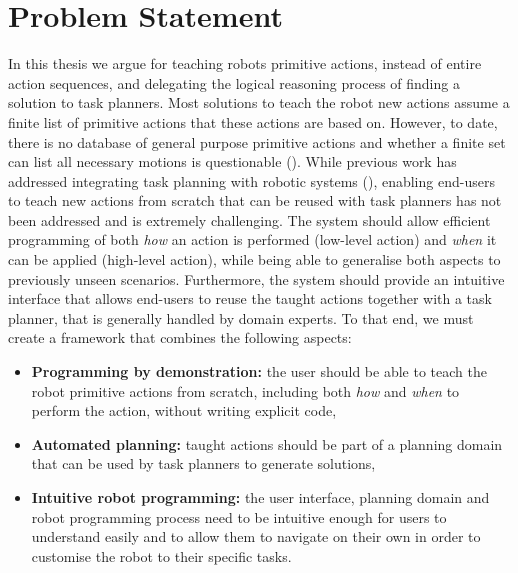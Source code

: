 
\section{Problem Statement}
In this thesis we argue for teaching robots primitive actions, instead of entire action sequences, and delegating the logical reasoning process of finding a solution to task planners.
Most solutions to teach the robot new actions assume a finite list of primitive actions that these actions are based on.
However, to date, there is no database of general purpose primitive actions and whether a finite set can list all necessary motions is questionable (\cite{billard2016learning}).
While previous work has addressed integrating task planning with robotic systems (\citet{abdo2013learning,cashmore2015rosplan}), enabling end-users to teach new actions from scratch that can be reused with task planners has not been addressed and is extremely challenging. 
The system should allow efficient programming of both \textit{how} an action is performed (low-level action) and \textit{when} it can be applied (high-level action), while being able to generalise both aspects to previously unseen scenarios. 
Furthermore, the system should provide an intuitive interface that allows end-users to reuse the taught actions together with a task planner, that is generally handled by domain experts.
To that end, we must create a framework that combines the following aspects:
\begin{itemize}
	\item \textbf{Programming by demonstration:} the user should be able to teach the robot primitive actions from scratch, including both \textit{how} and \textit{when} to perform the action, without writing explicit code,
	\item \textbf{Automated planning:} taught actions should be part of a planning domain that can be used by task planners to generate solutions,
	\item \textbf{Intuitive robot programming:} the user interface, planning domain and robot programming process need to be intuitive enough for users to understand easily and to allow them to navigate on their own in order to customise the robot to their specific tasks.
\end{itemize}

